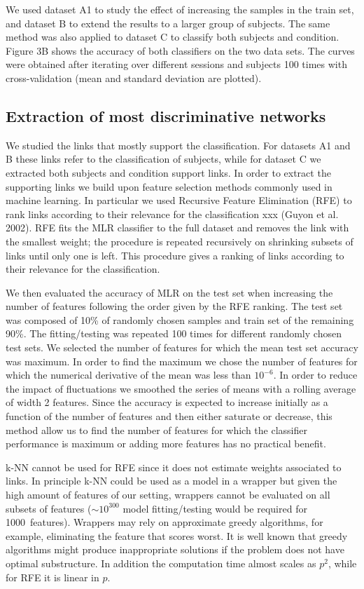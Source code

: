 \documentclass{article}
\begin{document}
We used dataset A1 to study the effect of increasing the samples in the train set, and dataset B to extend the results to a larger group of subjects. The same method was also applied to dataset C to classify both subjects and condition. Figure 3B shows the accuracy of both classifiers on the two data sets. The curves were obtained after iterating over different sessions and subjects 100 times with cross-validation (mean and standard deviation are plotted).

\subsection{Extraction of most discriminative networks}

We studied the links that mostly support the classification. For datasets A1 and B these links refer to the classification of subjects, while for dataset C we extracted both subjects and condition support links.
In order to extract the supporting links we build upon feature selection methods commonly used in machine learning. In particular we used Recursive Feature Elimination (RFE) to rank links according to their relevance for the classification xxx (Guyon et al. 2002). RFE fits the MLR classifier to the full dataset and removes the link with the smallest weight; the procedure is repeated recursively on shrinking subsets of links until only one is left. This procedure gives a ranking of links according to their relevance for the classification.

We then evaluated the accuracy of MLR on the test set when increasing the number of features following the order given by the RFE ranking. The test set was composed of 10\% of randomly chosen samples and train set of the remaining 90\%. The fitting/testing was repeated 100 times for different randomly chosen test sets. We selected the number of features for which the mean test set accuracy was maximum. In order to find the maximum we chose the number of features for which the numerical derivative of the mean was less than $10^{-6}$. In order to reduce the impact of fluctuations we smoothed the series of means with a rolling average of width 2 features. Since the accuracy is expected to increase initially as a function of the number of features and then either saturate or decrease, this method allow us to find the number of features for which the classifier performance is maximum or adding more features has no practical benefit.

k-NN cannot be used for RFE since it does not estimate weights associated to links. In principle k-NN could be used as a model in a wrapper but given the high amount of features of our setting, wrappers cannot be evaluated on all subsets of features ($\sim 10^{300}$ model fitting/testing would be required for 1000~features). Wrappers may rely on approximate greedy algorithms, for example, eliminating the feature that scores worst. It is well known that greedy algorithms might produce inappropriate solutions if the problem does not have optimal substructure. In addition the computation time almost scales as $p^2$, while for RFE it is linear in $p$.
  
\end{document}
